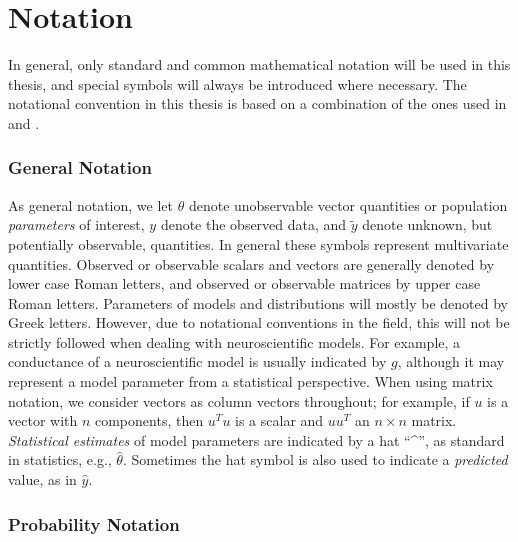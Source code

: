 \section{Notation}\label{sec:notation}

In general, only standard and common mathematical notation will be used in this thesis, and special symbols will always be introduced where necessary. The notational convention in this thesis is based on a combination of the ones used in \cite{ABC_ch1} and \cite{BDA}.

\subsubsection{General Notation}


As general notation, we let $\theta$ denote unobservable vector quantities or population \textit{parameters} of interest, $y$ denote the observed data, and $\tilde{y}$ denote unknown, but potentially observable, quantities. In general these symbols represent multivariate quantities. Observed or observable scalars and vectors are generally denoted by lower case Roman letters, and observed or observable matrices by upper case Roman letters. Parameters of models and distributions will mostly be denoted by Greek letters. However, due to notational conventions in the field, this will not be strictly followed when dealing with neuroscientific models. For example, a conductance of a neuroscientific model is usually indicated by $g$, although it may represent a model parameter from a statistical perspective. When using matrix notation, we consider vectors as column vectors throughout; for example, if $u$ is a vector with $n$ components, then $u^T u$ is a scalar and $uu^T$ an $n\times n$ matrix. \textit{Statistical estimates} of model parameters are indicated by a hat “\^{}”, as standard in statistics, e.g., $\hat{\theta}$. Sometimes the hat symbol is also used to indicate a \textit{predicted} value, as in $\hat{y}$.


\subsubsection{Probability Notation}


